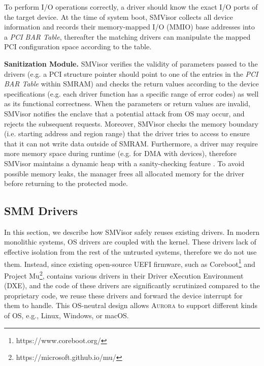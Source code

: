 \documentclass[journal,twocolumn,letterpaper,10pt]{IEEEtran}
\begin{document}
To perform I/O operations correctly, a driver should know the exact I/O ports of the target device. At the time of system boot, SMVisor collects all device information and records their memory-mapped I/O (MMIO) base addresses into a \emph{PCI BAR Table}, thereafter the matching drivers can manipulate the mapped PCI configuration space according to the table.

\textbf{Sanitization Module.}\label{shield}
SMVisor verifies the validity of parameters passed to the drivers (e.g. a PCI structure pointer should point to one of the entries in the \emph{PCI BAR Table} within SMRAM) and checks the return values according to the device specifications (e.g. each driver function has a specific range of error codes) as well as its functional correctness. When the parameters or return values are invalid, SMVisor notifies the enclave that a potential attack from OS may occur, and rejects the subsequent requests. Moreover, SMVisor checks the memory boundary (i.e. starting address and region range) that the driver tries to access to ensure that it can not write data outside of SMRAM. Furthermore, a driver may require more memory space during runtime (e.g. for DMA with devices), therefore SMVisor maintains a dynamic heap with a sanity-checking feature \cite{DBLP:conf/ccs/SilvestroLCLL17}. To avoid possible memory leaks, the manager frees all allocated memory for the driver before returning to the protected mode.

\subsection{SMM Drivers}\label{driver}
In this section, we describe how SMVisor safely reuses existing drivers. In modern monolithic systems, OS drivers are coupled with the kernel. These drivers lack of effective isolation from the rest of the untrusted systems, therefore we do not use them. Instead, since existing open-source UEFI firmware, such as Coreboot\footnote{https://www.coreboot.org/} and Project Mu\footnote{https://microsoft.github.io/mu/}, contains various drivers in their Driver eXecution Environment (DXE), and the code of these drivers are significantly scrutinized compared to the proprietary code, we reuse these drivers and forward the device interrupt for them to handle. This OS-neutral design allows \textsc{Aurora} to support different kinds of OS, e.g., Linux, Windows, or macOS.
\end{document}
